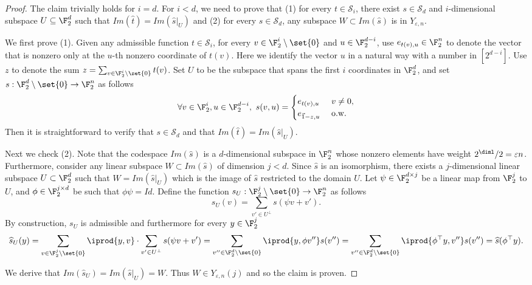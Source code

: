 \begin{proof}
The claim trivially holds for $i = d$. For $i < d$, we need to prove that (1) for every $t \in \mathcal{S}_i$, there exist $s\in \mathcal{S}_d$ and $i$-dimensional subspace $U \subseteq \F^d_2$ such that  $Im(\widehat{t})= Im(\widehat{s}|_U)$ and (2) for every $s\in \mathcal{S}_d$, any subspace $W \subset Im(\widehat{s})$ is in $Y_{\varepsilon,n}$.

We first prove (1). Given any admissible function $t\in \mathcal{S}_i$, for every $v\in \F_2^i\setminus\set{0}$ and $u\in\F_2^{d-i}$, use $e_{t(v),u}\in\F^n_2$ to denote the vector that is nonzero only at the $u$-th nonzero coordinate of $t(v)$. Here we identify the vector $u$ in a natural way with a number in $[2^{d-i}]$. Use $z$ to denote the sum $z = \sum_{v\in \F_2^i \setminus \set{0}} t(v)$. Set $U$ to be the subspace that spans the first $i$ coordinates in $\F_2^d$, and set $s:\F_2^d\setminus \set{0} \to  \F_2^n$ as follows 
\[\forall v\in \F_2^i, u \in \F_2^{d-i},~s(v,u)  = \begin{cases}
     e_{t(v),u} ~ &v\neq 0,\\
     e_{\Vec{1} - z, u} ~&\text{o.w.} 
\end{cases}\]
Then it is straightforward to verify that $s \in  \mathcal{S}_d$ and that $Im(\widehat{t})=Im(\widehat{s}|_U)$.

Next we check (2). Note that the codespace $Im(\widehat{s})$ is a $d$-dimensional subspace in $\F_2^n$ whose nonzero elements have weight $2^{\diml}/2 = \varepsilon n$. Furthermore, consider any linear subspace $W\subset Im(\widehat{s})$ of dimension $j<d$. Since $\widehat{s}$ is an isomorphism, there exists a $j$-dimensional linear subspace $U\subset \F_2^d$ such that $W = Im(\widehat{s}|_U)$ which is the image of $\widehat{s}$ restricted to the domain $U$. Let $\psi\in \F_2^{d\times j}$ be a linear map from $\F_2^j$ to $U$, and $\phi \in \F_2^{j\times d}$ be such that $\phi\psi = Id$. Define the function $s_U:\F_2^j\setminus\set{0} \to \F_2^n$ as follows
\[ s_U(v) = \sum_{v'\in U^{\perp}} s(\psi v+v').\]
By construction, $s_U$ is admissible and furthermore for every $y\in \F_2^j$ 
\[\widehat{s}_U(y) = \sum_{v \in \F_2^j\setminus \set{0}} \iprod{y,v}\cdot\sum_{v'\in U^{\perp}} s(\psi v+v') = \sum_{v''\in \F_2^d\setminus \set{0}} \iprod{y,\phi v''} s(v'') =\sum_{v''\in \F_2^d\setminus \set{0}} \iprod{\phi^\top y,v''} s(v'') =  \widehat{s}(\phi^\top y).\]

We derive that $Im(\widehat{s}_U) = Im(\widehat{s}|_U) = W$. Thus $W \in Y_{\varepsilon,n}(j)$ and so the claim is proven.
\end{proof}

